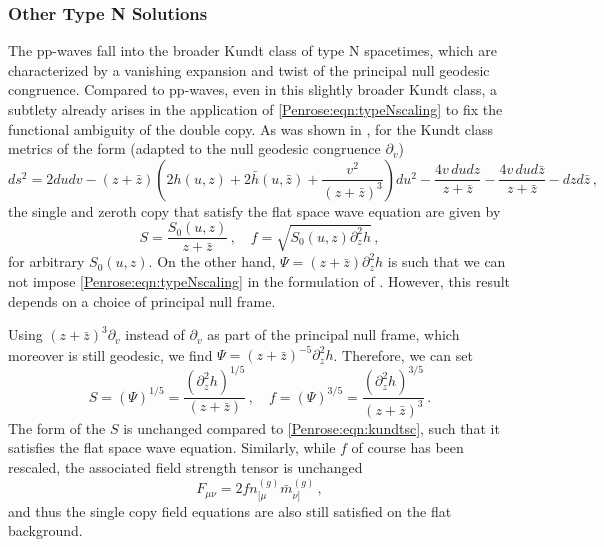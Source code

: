 \subsubsection{Other Type N Solutions}


The pp-waves fall into the broader Kundt class of type N spacetimes, which are characterized by a vanishing expansion and twist of the principal null geodesic
congruence. Compared to pp-waves, even in this slightly broader Kundt class, a subtlety already arises in the
application of \eqref{Penrose:eqn:typeNscaling} to fix the functional ambiguity of the double copy. As was shown in \cite{Godazgar:2020zbv}, for the Kundt class metrics of the form (adapted to the null geodesic congruence $\partial_v$)
\begin{equation}\label{Penrose:eqn:otherkundt}
ds^2 = 2du dv - (z+\bar{z})\left(2h(u,z)+2\bar{h}(u,\bar{z}) +\frac{v^2}{(z+\bar{z})^3}\right)du^2 -\frac{4v  \, du dz}{z+\bar{z}} -\frac{4v \, du d\bar{z}}{z+\bar{z}}  -dz d\bar{z} \, ,
\end{equation}
the single and zeroth copy that satisfy the flat space wave equation are given by
\begin{equation}\label{Penrose:eqn:kundtsc}
S = \frac{S_0(u,z)}{z+\bar{z}}  \, , \quad f = \sqrt{S_0(u,z)\partial_z^2 h} \, ,
\end{equation}
for arbitrary $S_0(u,z)$. On the other hand, $\Psi =  (z+\bar{z})\partial_z^2 h$ is such that we can not impose
\eqref{Penrose:eqn:typeNscaling} in the formulation of \cite{Godazgar:2020zbv}. However, this result depends on a choice of principal null frame. 

Using $\left(z+\bar{z}\right)^3\partial_v$ instead of $\partial_v$ as part of the principal null frame, which moreover is still geodesic,
we find $\Psi =  (z+\bar{z})^{-5} \partial_z^2 h$. Therefore, we can set
\begin{equation}
S = (\Psi)^{1/5} = \frac{(\partial_z^2 h)^{1/5}}{(z+\bar{z})} \, , \quad f = (\Psi)^{3/5} = \frac{(\partial_z^2 h)^{3/5}}{(z+\bar{z})^3} \, .
\end{equation}
The form of the  $S$ is unchanged compared to \eqref{Penrose:eqn:kundtsc}, such that it satisfies the flat space wave equation. Similarly, while $f$ of course has been rescaled, the associated field strength tensor is unchanged
\begin{equation}
F_{\mu \nu}  = 2 f n^{(g)}_{[\mu} \bar{m}^{(g)}_{\nu]} \, ,
\end{equation} 
and thus the single copy field equations are also still satisfied on the flat background.

